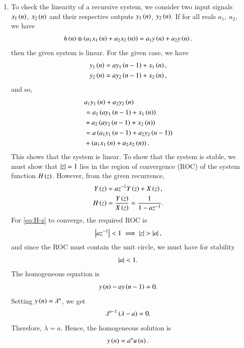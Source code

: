 \documentclass[journal,12pt,twocolumn]{IEEEtran}
\begin{document}
\begin{enumerate}[label=\theenumi.]
    \item To check the linearity of a recursive system, we consider two input
    signals \(x_1\left(n\right)\), \(x_2\left(n\right)\) and their respective outputs
    \(y_1\left(n\right)\), \(y_2\left(n\right)\). If for all reals \(a_1,\ a_2\), we have
    \begin{equation}
        h\left(n\right) \circledast \left(a_1x_1\left(n\right) + a_2x_2\left(n\right)\right) = a_1y\left(n\right) + a_2y\left(n\right).
        \label{eq:linearity}
    \end{equation}
    then the given system is linear. For the given case, we have
    \begin{align}
        y_1\left(n\right) &= ay_1\left(n-1\right) + x_1\left(n\right) \label{eq:y1}, \\
        y_2\left(n\right) &= ay_2\left(n-1\right) + x_2\left(n\right) \label{eq:y2},
    \end{align}
    and so,
    \begin{align}
        &a_1y_1\left(n\right) + a_2y_2\left(n\right) \nonumber \\
        &= a_1\left(ay_1\left(n-1\right) + x_1\left(n\right)\right) \nonumber \\
        &+ a_2\left(ay_2\left(n-1\right) + x_2\left(n\right)\right) \\
        &= a\left(a_1y_1\left(n-1\right) + a_2y_2\left(n-1\right)\right) \nonumber \\
        &+ \left(a_1x_1\left(n\right)+a_2x_2\left(n\right)\right).
    \end{align}
    This shows that the system is linear. To show that the system is stable,
    we must show that \(\left\vert z\right\vert = 1\) lies in the region of convergence (ROC)
    of the system function \(H\left(z\right)\). However, from the given recurrence,
    \begin{align}
        Y\left(z\right) &= az^{-1}Y\left(z\right) + X\left(z\right), \\
        H\left(z\right) &= \frac{Y\left(z\right)}{X\left(z\right)} = \frac{1}{1-az^{-1}}.
        \label{eq:H-z}
    \end{align}
    For \eqref{eq:H-z} to converge, the required ROC is
    \begin{equation}
        \left\vert az^{-1}\right\vert < 1 \implies \left\vert z\right\vert > \left\vert a\right\vert,
    \end{equation}
    and since the ROC must contain the unit circle, we must have for stability
    \begin{equation}
        \left\vert a\right\vert < 1.
        \label{eq:cond-a-stable}
    \end{equation}
    The homogeneous equation is
    \begin{equation}
        y\left(n\right) - ay\left(n-1\right) = 0.
        \label{eq:y-homogeneous}
    \end{equation}
    Setting \(y\left(n\right) = \lambda^n\), we get
    \begin{equation}
        \lambda^{n-1}\left(\lambda-a\right) = 0.
        \label{eq:lambda-eqn}
    \end{equation}
    Therefore, \(\lambda = a\). Hence, the homogeneous solution is
    \begin{equation}
        y\left(n\right) = a^nu\left(n\right).
    \end{equation}
\end{enumerate}
\end{document}
